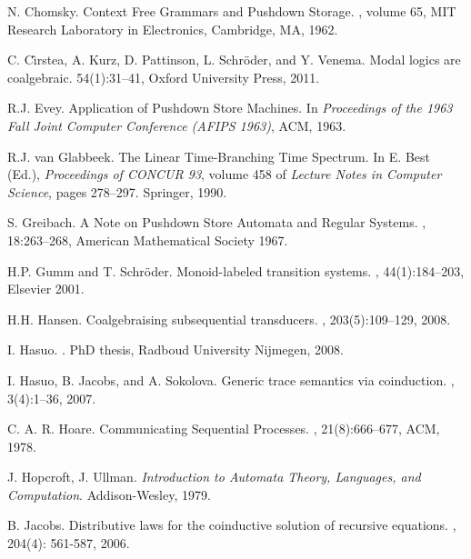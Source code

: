 \documentclass{LMCS}
\begin{document}
\begin{thebibliography}{10}
N. Chomsky.
\newblock Context Free Grammars and Pushdown Storage.
, volume 65, MIT Research Laboratory
   in Electronics, Cambridge, MA, 1962.

C. C\^{\i}rstea, A. Kurz, D. Pattinson, L. Schr{\"o}der, and Y. Venema.
\newblock Modal logics are coalgebraic.
 54(1):31--41, Oxford University Press, 2011.

R.J. Evey.
\newblock Application of Pushdown Store Machines.
\newblock In {\em Proceedings of the 1963 Fall Joint Computer Conference (AFIPS 1963)}, ACM, 1963.

R.J. van Glabbeek.
\newblock The Linear Time-Branching Time Spectrum.
\newblock In E. Best (Ed.), {\em Proceedings of CONCUR 93}, volume 458 of
    {\em Lecture Notes in Computer Science}, pages 278--297. Springer, 1990.

S. Greibach.
\newblock A Note on Pushdown Store Automata and Regular Systems.
, 18:263--268, American
  Mathematical Society 1967.

H.P. Gumm and T. Schr{\"o}der.
\newblock Monoid-labeled transition systems.
, 44(1):184--203, Elsevier 2001.

H.H. Hansen.
\newblock Coalgebraising subsequential transducers.
, 203(5):109--129, 2008.

I. Hasuo.
.
\newblock PhD thesis, Radboud University Nijmegen, 2008.

I. Hasuo, B. Jacobs, and A. Sokolova.
\newblock Generic trace semantics via coinduction.
, 3(4):1--36, 2007.

C. A. R. Hoare.
\newblock Communicating Sequential Processes.
, 21(8):666--677, ACM, 1978.

J. Hopcroft, J. Ullman.
\newblock \emph{Introduction to Automata Theory, Languages, and Computation}.
\newblock Addison-Wesley, 1979.

B. Jacobs.
\newblock Distributive laws for the coinductive solution of recursive equations.
, 204(4): 561-587, 2006.


\end{thebibliography}
\end{document}
